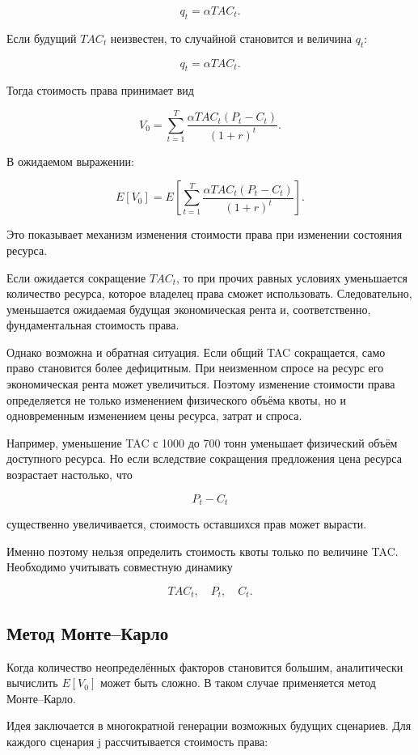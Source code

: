 \documentclass[12pt]{article}
\begin{document}
\[
q_t=\alpha TAC_t.
\]

Если будущий $TAC_t$ неизвестен, то случайной становится и величина $q_t$:

\[
q_t=\alpha TAC_t.
\]

Тогда стоимость права принимает вид

\[
V_0 =
\sum_{t=1}^{T}
\frac{
\alpha TAC_t(P_t-C_t)
}
{(1+r)^t}.
\]

В ожидаемом выражении:

\[
\boxed{
E[V_0] = E\left[
\sum_{t=1}^{T}
\frac{
\alpha TAC_t(P_t-C_t)
}
{(1+r)^t}
\right].
}
\]

Это показывает механизм изменения стоимости права при изменении состояния ресурса.

Если ожидается сокращение $TAC_t$, то при прочих равных условиях уменьшается количество ресурса, которое владелец права сможет использовать. Следовательно, уменьшается ожидаемая будущая экономическая рента и, соответственно, фундаментальная стоимость права.

Однако возможна и обратная ситуация. Если общий TAC сокращается, само право становится более дефицитным. При неизменном спросе на ресурс его экономическая рента может увеличиться. Поэтому изменение стоимости права определяется не только изменением физического объёма квоты, но и одновременным изменением цены ресурса, затрат и спроса.

Например, уменьшение TAC с 1000 до 700 тонн уменьшает физический объём доступного ресурса. Но если вследствие сокращения предложения цена ресурса возрастает настолько, что

\[
P_t-C_t
\]

существенно увеличивается, стоимость оставшихся прав может вырасти.

Именно поэтому нельзя определить стоимость квоты только по величине TAC. Необходимо учитывать совместную динамику

\[
TAC_t,\quad P_t,\quad C_t.
\]

\subsection{Метод Монте--Карло}

Когда количество неопределённых факторов становится большим, аналитически вычислить $E[V_0]$ может быть сложно. В таком случае применяется метод Монте--Карло.

Идея заключается в многократной генерации возможных будущих сценариев. Для каждого сценария j рассчитывается стоимость права:
\end{document}
